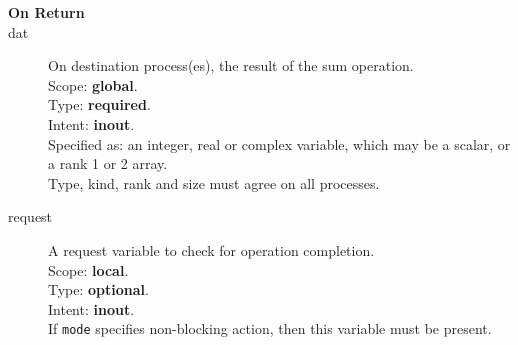 \begin{description}
\item[\bf On Return]
\item[dat] On destination process(es), the result of the sum operation.\\
Scope: {\bf global}.\\
Type: {\bf required}.\\
Intent: {\bf inout}.\\
Specified as: an integer, real or complex variable, which may be a
scalar, or a rank 1 or 2 array. \\
Type, kind, rank and size must agree on all processes.
\item[request] A request variable to check for operation completion.\\
Scope: {\bf local}.\\
Type: {\bf optional}.\\
Intent: {\bf inout}.\\
If \verb|mode| specifies non-blocking action, then this
variable must be present.
\end{description}

